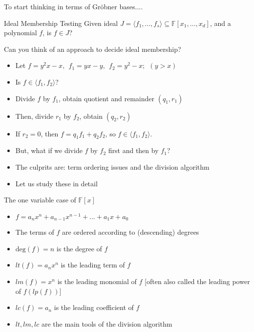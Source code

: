 \documentclass[xcolor=dvipsnames]{beamer}
\newcommand{\F}{{\mathbb{F}}}
\newcommand{\bi}{\begin{itemize}}
\newcommand{\ei}{\end{itemize}}
\begin{document}
\begin{frame}{{\large To start thinking in terms of Gr\"obner bases....}}
\begin{block}{Ideal Membership Testing}
Given ideal $J = \langle f_1, \dots, f_s\rangle \subseteq \F[x_1,
  \dots, x_d]$, and a polynomial $f$, is $f \in J$?
\end{block}

\pause 
Can you think of an approach to decide ideal membership?

\pause 
\bi [<+->]
\item Let $f = y^2x - x, ~~f_1 = yx - y, ~~f_2 = y^2 - x; ~~(y>x)$
\item Is $f \in \langle f_1, f_2 \rangle$?
\item Divide $f$ by $f_1$, obtain quotient and remainder $(q_1, r_1)$
\item Then, divide $r_1$ by $f_2$, obtain $(q_2, r_2)$
\item If $r_2 = 0$, then $f = q_1 f_1 + q_2 f_2$, so $f \in \langle f_1, f_2\rangle$.
\item But, what if we divide $f$ by $f_2$ first and then by $f_1$?
\item The culprits are: \alert{term ordering issues and the division
  algorithm}
\item Let us study these in detail
\ei

\end{frame}

\begin{frame}{{\large The one variable case of $\F[x]$}}

\bi
\item $f = a_n x^n + a_{n-1}x^{n-1} + \dots + a_1 x + a_0$
\item The terms of $f$ are ordered according to (descending) degrees
\item $\text{deg}(f) = n$ is the degree of $f$
\item $lt(f) = a_n x^n$ is the \alert{leading term} of $f$
\item $lm(f) = x^n$ is the \alert{leading monomial} of $f$ [often also
  called the leading power of $f (lp(f))$]
\item $lc(f) = a_n$ is the \alert{leading coefficient} of $f$
\item $lt, lm, lc$ are the main tools of the division algorithm
\ei

\end{frame}
\end{document}
